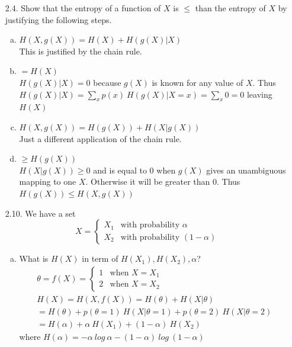 \documentclass[10pt]{article}
\begin{document}
\begin{itemize}
        \item[2.4.] Show that the entropy of a function of $X$
                is $\leq$ than the entropy of $X$ by justifying the
                following steps.
                \begin{enumerate}[a)]
                  \item $H(X,g(X))=H(X) + H(g(X) | X)$\\
                    This is justified by the chain rule.
                  \item $=H(X)$ \\
                    $H(g(X)|X)=0$ because $g(X)$ is known for any value of $X$. 
                    Thus $H(g(X)|X)=\sum_{x}p(x)\ H(g(X)|X=x)=\sum_{x}0=0$ leaving
                    $H(X)$
                  \item $H(X,g(X))=H(g(X))+H(X|g(X))$ \\
                    Just a different application of the chain rule.
                  \item $\geq H(g(X))$\\
                   $H(X|g(X))\geq0$ and is equal to 0 when $g(X)$ gives an 
                   unambiguous mapping to one $X$. Otherwise it will be 
                   greater than 0. Thus $H(g(X))\leq H(X,g(X))$ 
                \end{enumerate}

        \item[2.10.] We have a set
        \[
         X=\begin{cases} X_1 & \mbox{with probability } \alpha \\
         X_2 & \mbox{with probability }(1-\alpha) \end{cases} 
        \]
         
          \begin{enumerate}[a)]
            \item What is $H(X)$ in term of $H(X_1), H(X_2), \alpha$? 
              \begin{eqnarray*} 
              	\theta = f(X) = \begin{cases}1 & \mbox{when } X=X_{1}\\ 2 & \mbox{when } X = X_{2} \end{cases}\\
	H(X) = H(X,f(X)) = H(\theta) + H(X|\theta)\\
	= H(\theta)+p(\theta = 1)\ H(X|\theta=1)+p(\theta=2)\ H(X|\theta=2)\\
	= H(\alpha) + \alpha\ H(X_{1}) + (1-\alpha)\ H(X_{2})
              \end{eqnarray*}
              where \(H(\alpha) = -\alpha\ log\ \alpha - (1 - \alpha )\ log\ (1-\alpha)\)
             

\end{enumerate}
\end{itemize}
\end{document}
